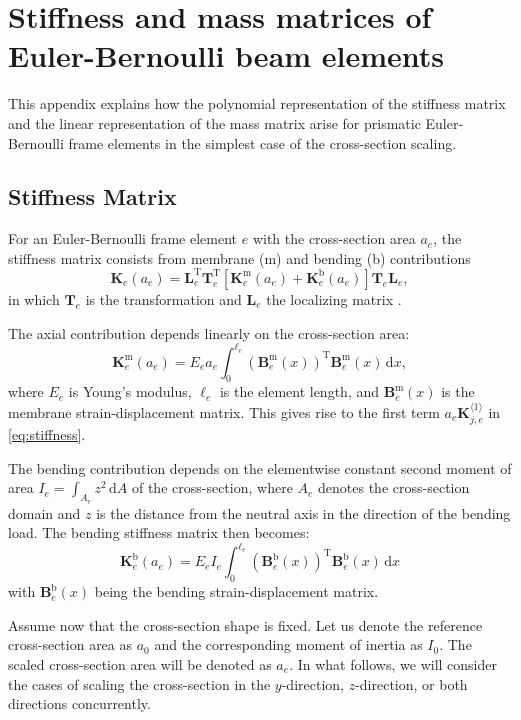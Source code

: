 \documentclass[final,onefignum,onetabnum]{siamart220329}
\begin{document}
\appendix
{
\section{Stiffness and mass matrices of Euler-Bernoulli beam elements}\label{app:polydep}

This appendix explains how the polynomial representation of the stiffness matrix and the linear representation of the mass matrix arise for prismatic Euler-Bernoulli frame elements in the simplest case of the cross-section scaling.

\subsection{Stiffness Matrix}

For an Euler-Bernoulli frame element $e$ with the cross-section area $a_e$, the stiffness matrix consists from membrane (m) and bending (b) contributions
%
$$\mathbf{K}_{e}(a_e) = \mathbf{L}_e^\mathrm{T} \mathbf{T}_e^\mathrm{T} \left[\mathbf{K}_{e}^{\text{m}}(a_e) + \mathbf{K}_{e}^{\text{b}}(a_e)\right] \mathbf{T}_e \mathbf{L}_e,$$
%
in which $\mathbf{T}_e$ is the transformation and $\mathbf{L}_e$ the localizing matrix \cite{Fish2007}.

The axial contribution depends linearly on the cross-section area:
%
$$\mathbf{K}_{e}^{\text{m}}(a_e) = E_e a_e \int_{0}^{\ell_e} \left(\mathbf{B}_e^\mathrm{m}(x)\right)^\mathrm{T} \mathbf{B}_e^\mathrm{m}(x) \, \mathrm{d}x,$$
%
where $E_e$ is Young's modulus, $\ell_e$ is the element length, and $\mathbf{B}^\mathrm{m}_e(x)$ is the membrane strain-displacement matrix. This gives rise to the first term $a_e \mathbf{K}_{j,e}^{\langle 1\rangle}$ in \eqref{eq:stiffness}.

The bending contribution depends on the elementwise constant second moment of area $I_e = \int_{A_e} z^2 \, \mathrm{d}A$ of the cross-section, where $A_e$ denotes the cross-section domain and $z$ is the distance from the neutral axis in the direction of the bending load. The bending stiffness matrix then becomes:
%
$$\mathbf{K}_{e}^{\text{b}}(a_e) = E_e I_e \int_{0}^{\ell_e} \left(\mathbf{B}_e^\mathrm{b}(x)\right)^\mathrm{T} \mathbf{B}_e^\mathrm{b}(x) \, \mathrm{d}x$$
%
with $\mathbf{B}_e^\mathrm{b}(x)$ being the bending strain-displacement matrix. 

Assume now that the cross-section shape is fixed. Let us denote the reference cross-section area as $a_0$ and the corresponding moment of inertia as $I_0$. The scaled cross-section area will be denoted as $a_e$. In what follows, we will consider the cases of scaling the cross-section in the $y$-direction, $z$-direction, or both directions concurrently.

}
\end{document}
